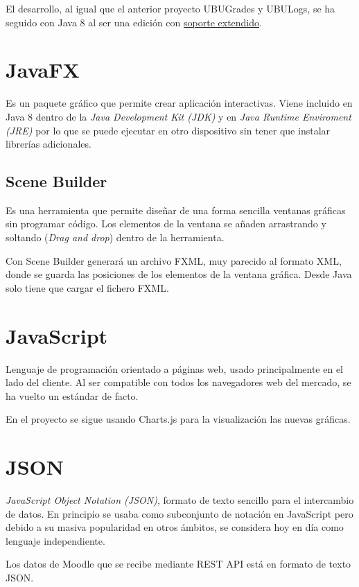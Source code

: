 El desarrollo, al igual que el anterior proyecto UBUGrades y UBULogs, se ha seguido con Java 8 al ser una edición con \href{https://www.oracle.com/technetwork/java/java-se-support-roadmap.html
}{soporte extendido}.

\section{JavaFX}
Es un paquete gráfico que permite crear aplicación interactivas. Viene incluido en Java 8 dentro de la \textit{Java Development Kit (JDK)} y en \textit{Java Runtime Enviroment (JRE)} por lo que se puede ejecutar en otro dispositivo sin tener que instalar librerías adicionales.

\subsection{Scene Builder}
Es una herramienta que permite diseñar de una forma sencilla ventanas gráficas sin programar código. Los elementos de la ventana se añaden arrastrando y soltando (\textit{Drag and drop}) dentro de la herramienta.


Con Scene Builder generará un archivo FXML, muy parecido al formato XML, donde se guarda las posiciones de los elementos de la ventana gráfica. Desde Java solo tiene que cargar el fichero FXML.

\section{JavaScript}
Lenguaje de programación orientado a páginas web, usado principalmente en el lado del cliente. Al ser compatible con todos los navegadores web del mercado, se ha vuelto un estándar de facto.

En el proyecto se sigue usando Charts.js para la visualización las nuevas gráficas.

\section{JSON}

\textit{JavaScript Object Notation (JSON)}, formato de texto sencillo para el intercambio de datos. En principio se usaba como subconjunto de notación en JavaScript pero debido a su masiva popularidad en otros ámbitos, se considera hoy en día como lenguaje independiente.

Los datos de Moodle que se recibe mediante REST API está en formato de texto JSON.

